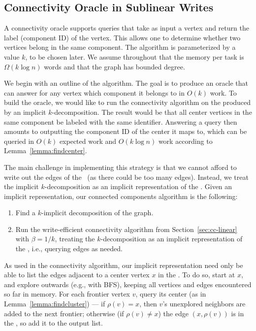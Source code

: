 \subsection{Connectivity Oracle in Sublinear Writes}\label{sec:cc-sublinear}
A connectivity oracle supports queries that take as input a vertex and
return the label (component ID) of the vertex.  This allows one to
determine whether two vertices belong in the same component.  The
algorithm is parameterized by a value $k$, to be chosen later.  We
assume throughout that the \local{} memory per task is
$\Omega(k\log n)$ words and that the graph has bounded degree.

We begin with an outline of the algorithm.  The goal is to produce an
oracle that can answer for any vertex which component it belongs to in
$O(k)$ work.  To build the oracle, we would like to run the
connectivity algorithm on the \clustergraph{} produced by an implicit
$k$-decomposition. The result would be that all center vertices in the
same component be labeled with the same identifier.  Answering a query
then amounts to outputting the component ID of the center it maps to,
which can be queried in $O(k)$ expected work and $O(k\log n)$ work
\whp{} according to Lemma~\ref{lemma:findcenter}.

The main challenge in implementing this strategy is that we cannot
afford to write out the edges of the \clustergraph\ (as there could be
too many edges). Instead, we treat the implicit $k$-decomposition as
an implicit representation of the \clustergraph{}. Given an implicit
representation, our connected components algorithm is the following:
\begin{enumerate}
\item Find a $k$-implicit decomposition of the graph.
\item Run the write-efficient connectivity algorithm from
  Section~\ref{sec:cc-linear} with $\beta=1/k$, treating the
  $k$-decomposition as an implicit representation of the
  \clustergraph{}, i.e., querying edges as needed.
\end{enumerate}

As used in the connectivity algorithm, our implicit representation
need only be able to list the edges adjacent to a center vertex $x$ in
the \clustergraph{}.  To do so, start at $x$, and explore outwards
(e.g., with BFS), keeping all vertices and edges encountered so far in
\local{} memory.  For each frontier vertex $v$, query its center (as
in Lemma~\ref{lemma:findcluster}) --- if $\rho(v) = x$, then $v$'s
unexplored neighbors are added to the next frontier; otherwise (if
$\rho(v) \neq x$) the edge $(x,\rho(v))$ is in the \clustergraph{}, so
add it to the output list.

